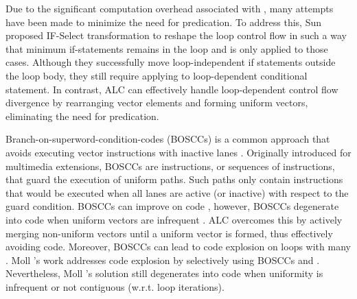 Due to the significant computation overhead associated with \ifconversion, many attempts have been made to minimize the need for predication. To address this, Sun \etal proposed IF-Select transformation \cite{refactoring-loops} to reshape the loop control flow in such a way that minimum if-statements remains in the loop and \ifconversion is only applied to those cases. Although they successfully move loop-independent if statements outside the loop body, they still require applying \ifconversion to loop-dependent conditional statement. In contrast, ALC can effectively handle loop-dependent control flow divergence by rearranging vector elements and forming uniform vectors, eliminating the need for predication.

Branch-on-superword-condition-codes (BOSCCs) is a common approach that avoids executing vector instructions with inactive lanes \cite{shin_introducing_2007}.
Originally introduced for multimedia extensions, BOSCCs are instructions, or sequences of instructions, that guard the execution of uniform paths.
Such paths only contain instructions that would be executed when all lanes are active (or inactive) with respect to the guard condition.
BOSCCs can improve on \ifconverted code \cite{shin_evaluating_2009}, however, BOSCCs degenerate into \ifconverted code when uniform vectors are infrequent \cite{praharenka_vectorizing_2022}.
ALC overcomes this by actively merging non-uniform vectors until a uniform vector is formed, thus effectively avoiding \ifconverted code. 
Moreover, BOSCCs can lead to code explosion on loops with many \cpaths.
Moll \etal's work addresses code explosion by selectively using BOSCCs and \ifconversion \cite{moll_partial_2018}.
Nevertheless, Moll \etal's solution still degenerates into \ifconverted code when uniformity is infrequent or not contiguous (w.r.t. loop iterations).

